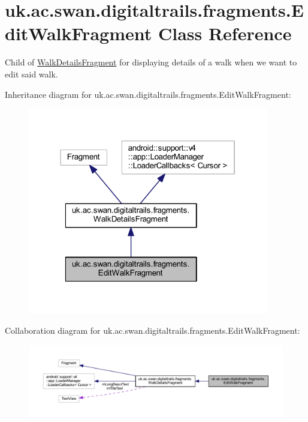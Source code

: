 \hypertarget{classuk_1_1ac_1_1swan_1_1digitaltrails_1_1fragments_1_1_edit_walk_fragment}{\section{uk.\+ac.\+swan.\+digitaltrails.\+fragments.\+Edit\+Walk\+Fragment Class Reference}
\label{classuk_1_1ac_1_1swan_1_1digitaltrails_1_1fragments_1_1_edit_walk_fragment}
}


Child of \hyperlink{classuk_1_1ac_1_1swan_1_1digitaltrails_1_1fragments_1_1_walk_details_fragment}{Walk\+Details\+Fragment} for displaying details of a walk when we want to edit said walk.  




Inheritance diagram for uk.\+ac.\+swan.\+digitaltrails.\+fragments.\+Edit\+Walk\+Fragment\+:\nopagebreak
\begin{figure}[H]
\begin{center}
\leavevmode
\includegraphics[width=298pt]{classuk_1_1ac_1_1swan_1_1digitaltrails_1_1fragments_1_1_edit_walk_fragment__inherit__graph}
\end{center}
\end{figure}


Collaboration diagram for uk.\+ac.\+swan.\+digitaltrails.\+fragments.\+Edit\+Walk\+Fragment\+:\nopagebreak
\begin{figure}[H]
\begin{center}
\leavevmode
\includegraphics[width=350pt]{classuk_1_1ac_1_1swan_1_1digitaltrails_1_1fragments_1_1_edit_walk_fragment__coll__graph}
\end{center}
\end{figure}
